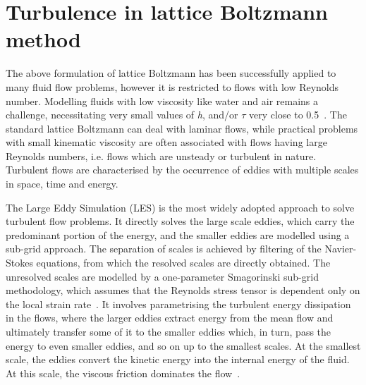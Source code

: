 
\section{Turbulence in lattice Boltzmann method}

The above formulation of lattice Boltzmann has been successfully 
applied to many fluid flow problems, however it is restricted to flows with low 
Reynolds number. Modelling fluids with low viscosity like water and air 
remains a challenge, necessitating very small values of \textit{h}, and/or 
$\tau$ very close to 0.5~\citep{He1997}. The standard lattice Boltzmann can 
deal with laminar flows, while practical problems with small kinematic 
viscosity are often associated with flows having large Reynolds numbers, i.e. 
flows which are unsteady or turbulent in nature. Turbulent flows are 
characterised by the occurrence of eddies with multiple scales in space, time 
and energy.

The Large Eddy Simulation (LES) is the most widely adopted approach to 
solve turbulent flow problems. It directly solves the large scale eddies, which 
carry the predominant portion of the energy, and the smaller eddies are 
modelled using a sub-grid approach. The separation of scales is achieved by 
filtering of the Navier-Stokes equations, from which the resolved scales are 
directly obtained. The unresolved scales are modelled by a one-parameter 
Smagorinski sub-grid methodology, which assumes that the Reynolds stress 
tensor is dependent only on the local strain rate~\citep{Smagorinsky1963}. It 
involves parametrising the turbulent energy dissipation in the flows, where the 
larger eddies extract energy from the mean flow and ultimately transfer some of 
it to the smaller eddies which, in turn, pass the energy to even smaller 
eddies, and so on up to the smallest scales. At the smallest scale, the eddies 
convert the kinetic energy into the internal energy of the fluid. At this 
scale, the viscous friction dominates the flow~\citep{Frisch1995}.

